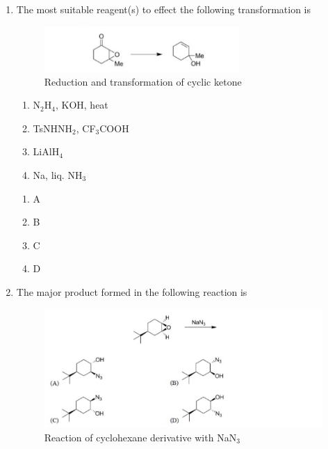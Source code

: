 \documentclass[journal,12pt,onecolumn]{exam}
\theoremstyle{remark}
\newcommand{\correct}{\textcolor{correctgreen}{\checkmark}}
\newcommand{\wrong}{\textcolor{wrongred}{\ding{55}}} %
\begin{document}
\begin{enumerate}
\item 
The most suitable reagent(s) to effect the following transformation is
\begin{figure}[H]
\centering
\includegraphics[width=0.7\textwidth]{figs/image14.png}
\caption{Reduction and transformation of cyclic ketone}
\label{fig:q58}
\end{figure}

\begin{enumerate}
    \item N$_2$H$_4$, KOH, heat
    \item TsNHNH$_2$, CF$_3$COOH
    \item LiAlH$_4$
    \item Na, liq. NH$_3$
\end{enumerate}

\hfill{}

\begin{multicols}{2}
\begin{enumerate}[leftmargin=*, align=left]
    \item \wrong A
    \item \wrong B
    \item \wrong C
    \item \correct D
\end{enumerate}
\end{multicols}




\item 
The major product formed in the following reaction is
\begin{figure}[H]
\centering
\includegraphics[width=\textwidth]{figs/image15.png}
\caption{Reaction of cyclohexane derivative with NaN$_3$}
\label{fig:q59}
\end{figure}


\end{enumerate}
\end{document}
